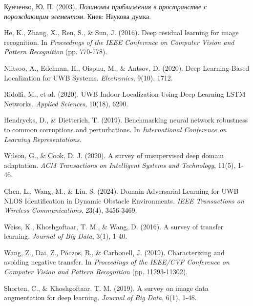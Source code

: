 \documentclass[12pt,a4paper]{article}
\begin{document}
\begin{thebibliography}{99}
		Кунченко, Ю. П. (2003). \textit{Полиномы приближения в пространстве с порождающим элементом}. Киев: Наукова думка.
		
		He, K., Zhang, X., Ren, S., \& Sun, J. (2016). Deep residual learning for image recognition. In \textit{Proceedings of the IEEE Conference on Computer Vision and Pattern Recognition} (pp. 770-778).
		
		Niitsoo, A., Edelman, H., Oispuu, M., \& Antsov, D. (2020). Deep Learning-Based Localization for UWB Systems. \textit{Electronics}, 9(10), 1712.
		
		Ridolfi, M., et al. (2020). UWB Indoor Localization Using Deep Learning LSTM Networks. \textit{Applied Sciences}, 10(18), 6290.
		
		Hendrycks, D., \& Dietterich, T. (2019). Benchmarking neural network robustness to common corruptions and perturbations. In \textit{International Conference on Learning Representations}.
		
		Wilson, G., \& Cook, D. J. (2020). A survey of unsupervised deep domain adaptation. \textit{ACM Transactions on Intelligent Systems and Technology}, 11(5), 1-46.
		
		Chen, L., Wang, M., \& Liu, S. (2024). Domain-Adversarial Learning for UWB NLOS Identification in Dynamic Obstacle Environments. \textit{IEEE Transactions on Wireless Communications}, 23(4), 3456-3469.
		
		Weiss, K., Khoshgoftaar, T. M., \& Wang, D. (2016). A survey of transfer learning. \textit{Journal of Big Data}, 3(1), 1-40.
		
		Wang, Z., Dai, Z., Póczos, B., \& Carbonell, J. (2019). Characterizing and avoiding negative transfer. In \textit{Proceedings of the IEEE/CVF Conference on Computer Vision and Pattern Recognition} (pp. 11293-11302).
		
		Shorten, C., \& Khoshgoftaar, T. M. (2019). A survey on image data augmentation for deep learning. \textit{Journal of Big Data}, 6(1), 1-48.
		

\end{thebibliography}
\end{document}
